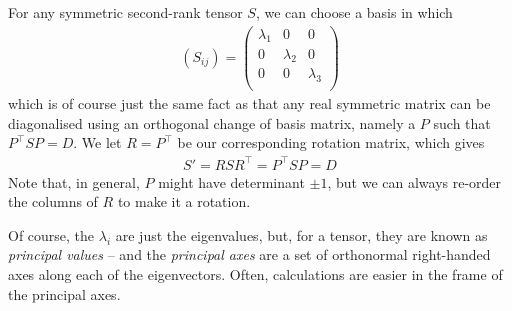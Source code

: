 \documentclass{../../template/note}
\begin{document}
    For any symmetric second-rank tensor \(S\), we can choose a basis in which
    \begin{align*}
        (S_{ij}) = \begin{pmatrix}
            \lambda_1 & 0 & 0 \\
            0 & \lambda_2 & 0 \\
            0 & 0 & \lambda_3 \\
        \end{pmatrix}
    \end{align*}
    which is of course just the same fact as that any real symmetric matrix can be diagonalised using an orthogonal change of basis matrix, namely a \(P\) such that \(P^\intercal SP =D\). We let \(R = P^\intercal\) be our corresponding rotation matrix, which gives
    \begin{align*}
        S' = RSR^\intercal = P^\intercal SP = D
    \end{align*}
    Note that, in general, \(P\) might have determinant \(\pm 1\), but we can always re-order the columns of \(R\) to make it a rotation.

    Of course, the \(\lambda_i\) are just the eigenvalues, but, for a tensor, they are known as \emph{principal values} -- and the \emph{principal axes} are a set of orthonormal right-handed axes along each of the eigenvectors. Often, calculations are easier in the frame of the principal axes.
\end{document}
